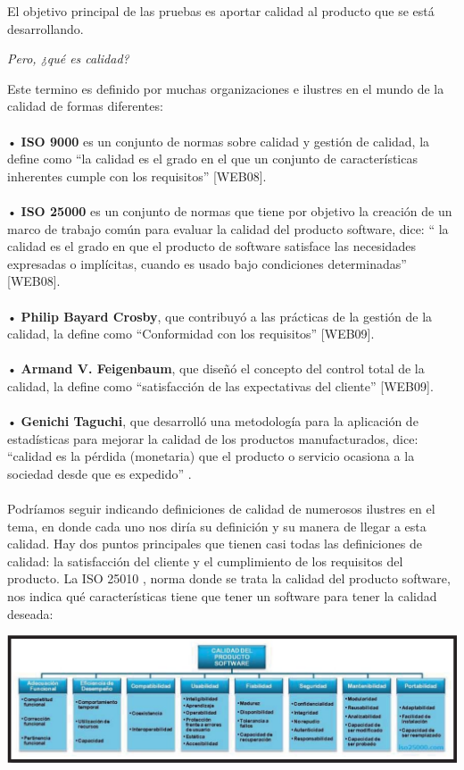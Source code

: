 \documentclass[12pt,letterpaper]{article}
\begin{document}
    El objetivo principal de las pruebas es aportar calidad al producto que se está desarrollando.
   
    \begin{center}
        \textit{Pero, ¿qué es calidad?}
    \end{center}
Este termino es definido por muchas organizaciones e ilustres en el mundo de la calidad de formas diferentes:
\\
\\
•	\textbf{ISO 9000} es un conjunto de normas sobre calidad y gestión de calidad, la define como “la calidad es el grado en el que un conjunto de características inherentes cumple con los requisitos” [WEB08].
\\
\\
•	\textbf{ISO 25000} es un conjunto de normas que tiene por objetivo la creación de un marco de trabajo común para evaluar la calidad del producto software, dice: “ la calidad es el grado en que el producto de software satisface las necesidades expresadas o implícitas, cuando es usado bajo condiciones determinadas” [WEB08].
\\
\\
•	\textbf{Philip Bayard Crosby}, que contribuyó a las prácticas de la gestión de la calidad, la define como “Conformidad con los requisitos” [WEB09].
\\
\\
•	\textbf{Armand V. Feigenbaum}, que diseñó el concepto del control total de la calidad, la define como “satisfacción de las expectativas del cliente” [WEB09].
\\
\\
•	\textbf{Genichi Taguchi}, que desarrolló una metodología para la aplicación de estadísticas para mejorar la calidad de los productos manufacturados, dice: “calidad es la pérdida (monetaria) que el producto o servicio ocasiona a la sociedad desde que es expedido” .
\\
\\
Podríamos seguir indicando definiciones de calidad de numerosos ilustres en el tema, en donde cada uno nos diría su definición y su manera de llegar a esta 
calidad. Hay dos puntos principales que tienen casi todas las definiciones de calidad: la satisfacción del cliente y el cumplimiento de los requisitos del producto.
La ISO 25010 , norma donde se trata la calidad del producto software, nos indica qué características tiene que tener un software para tener la calidad deseada:
\\
\begin{center}
	\includegraphics[width=15cm]{./img/image1.png} 
\end{center}
\end{document}
